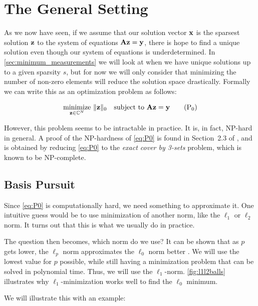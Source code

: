 \section{The General Setting}
As we now have seen, if we assume that our solution vector $ \mathbf{x} $ is the sparsest solution $ \mathbf{z} $ to the system of equations $ \mathbf{A}\mathbf{z} = \mathbf{y} $, there is hope to find a unique solution even though our system of equations is underdetermined. In \cref{sec:minimum_measurements} we will look at when we have unique solutions up to a given sparsity $ s $, but for now we will only consider that minimizing the number of non-zero elements will reduce the solution space drastically. Formally we can write this as an optimization problem as follows:

\begin{equation}
	\underset{\mathbf{z} \in \mathbb{C}^{N}}{\text{minimize}}~ \lVert\mathbf{z}\rVert_0
	\quad\text{subject to}~ \mathbf{A}\mathbf{z} = \mathbf{y}
	\tag{P$_0$}
	\label{eq:P0}
\end{equation}

However, this problem seems to be intractable in practice. It is, in fact, NP-hard in general. A proof of the NP-hardness of \eqref{eq:P0} is found in Section~2.3 of \cite{foucart13intro}, and is obtained by reducing \eqref{eq:P0} to the \textit{exact cover by 3-sets} problem, which is known to be NP-complete.





\subsection{Basis Pursuit}
Since \eqref{eq:P0} is computationally hard, we need something to approximate it. One intuitive guess would be to use minimization of another norm, like the $ \ell_{1} $ or $ \ell_{2} $ norm. It turns out that this is what we usually do in practice. 

The question then becomes, which norm do we use? It can be shown that  as $ p $ gets lower, the $ \ell_{p} $ norm approximates the $ \ell_{0} $ norm better \cite[Section 4.1]{foucart13intro}. We will use the lowest value for $ p $ possible, while still having a minimization problem that can be solved in polynomial time. Thus, we will use the $ \ell_{1} $-norm. \cref{fig:l1l2balls} illustrates why $ \ell_{1} $-minimization works well to find the $ \ell_{0} $ minimum. 


We will illustrate this with an example:

